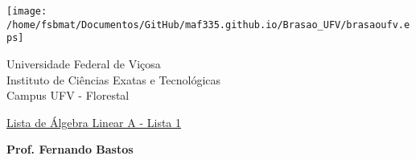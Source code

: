 \documentclass{report}
\begin{document}
\vspace*{-2cm}

\begin{center}
\begin{minipage}[s]{2cm}
\hspace{-1.3cm}\texttt{[image: /home/fsbmat/Documentos/GitHub/maf335.github.io/Brasao\_UFV/brasaoufv.eps]}
\end{minipage}
\begin{minipage}[s]{13cm}
{\begin{center} {\sc \Large Universidade Federal de Vi\c{c}osa}\\
{\sc \large Instituto de Ci\^encias Exatas e Tecnológicas}\\
{\sc \large Campus UFV - Florestal}\\
\end{center}}
\end{minipage}\begin{minipage}[s]{2 cm}
\end{minipage}
\end{center}

\vspace{-0.3cm}



\medskip

\begin{center}

\underline{\underline{{\large{\sc Lista de Álgebra Linear A - Lista 1}}}}

\bigskip

{\large {\bf Prof. Fernando Bastos}}
%
\end{center}
\end{document}
